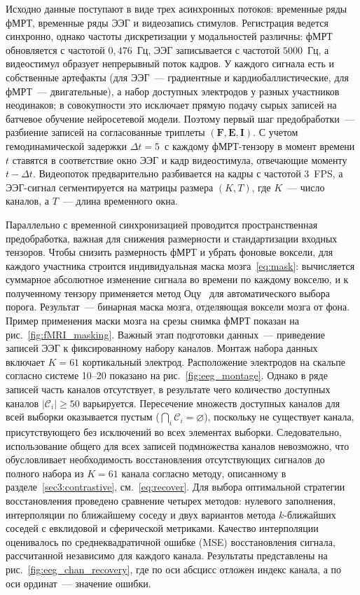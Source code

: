 Исходно данные поступают в виде трех асинхронных потоков: временные ряды фМРТ, временные ряды ЭЭГ и видеозапись стимулов. Регистрация ведется синхронно, однако частоты дискретизации у модальностей различны: фМРТ обновляется с частотой $0{,}476$~Гц, ЭЭГ записывается с частотой $5000$~Гц, а видеостимул образует непрерывный поток кадров. У каждого сигнала есть и собственные артефакты (для ЭЭГ~--- градиентные и кардиобаллистические, для фМРТ~--- двигательные), а набор доступных электродов у разных участников неодинаков; в совокупности это исключает прямую подачу сырых записей на батчевое обучение нейросетевой модели. Поэтому первый шаг предобработки~--- разбиение записей на согласованные триплеты $(\mathbf{F}, \mathbf{E}, \mathbf{I})$. С учетом гемодинамической задержки $\Delta t = 5$~с каждому фМРТ-тензору в момент времени $t$ ставятся в соответствие окно ЭЭГ и кадр видеостимула, отвечающие моменту $t - \Delta t$. Видеопоток предварительно разбивается на кадры с частотой 3~FPS, а ЭЭГ-сигнал сегментируется на матрицы размера $(K, T)$, где $K$~--- число каналов, а $T$~--- длина временного окна.

Параллельно с временной синхронизацией проводится пространственная предобработка, важная для снижения размерности и стандартизации входных тензоров. Чтобы снизить размерность фМРТ и убрать фоновые воксели, для каждого участника строится индивидуальная маска мозга~\eqref{eq:mask}: вычисляется суммарное абсолютное изменение сигнала во времени по каждому вокселю, и к полученному тензору применяется метод Оцу~\cite{otsu1975threshold} для автоматического выбора порога. Результат~--- бинарная маска мозга, отделяющая воксели мозга от фона. Пример применения маски мозга на срезы снимка фМРТ показан на рис.~\ref{fig:fMRI_masking}. 
Важный этап подготовки данных~--- приведение записей ЭЭГ к фиксированному набору каналов. Монтаж набора данных~\cite{Telesford2023} включает $K = 61$ кортикальный электрод. Расположение электродов на скальпе согласно системе 10--20 показано на рис.~\ref{fig:eeg_montage}. Однако в ряде записей часть каналов отсутствует, в результате чего количество доступных каналов $|\mathcal{C}_i| \ge 50$ варьируется. Пересечение множеств доступных каналов для всей выборки оказывается пустым ($\bigcap_i \mathcal{C}_i = \varnothing$), поскольку не существует канала, присутствующего без исключений во всех элементах выборки. Следовательно, использование общего для всех записей подмножества каналов невозможно, что обусловливает необходимость восстановления отсутствующих сигналов до полного набора из $K = 61$ канала согласно методу, описанному в разделе~\ref{sec3:contrastive}, см.~\eqref{eq:recover}.
Для выбора оптимальной стратегии восстановления проведено сравнение четырех методов: нулевого заполнения, интерполяции по ближайшему соседу и двух вариантов метода $k$-ближайших соседей с евклидовой и сферической метриками. Качество интерполяции оценивалось по среднеквадратичной ошибке (MSE) восстановления сигнала, рассчитанной независимо для каждого канала. Результаты представлены на рис.~\ref{fig:eeg_chan_recovery}, где по оси абсцисс отложен индекс канала, а по оси ординат~--- значение ошибки.

